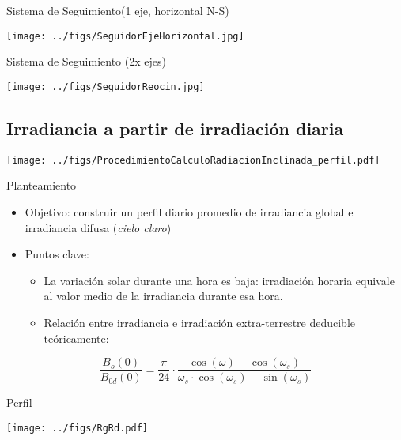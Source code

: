 \documentclass[xcolor={usenames,svgnames,dvipsnames}]{beamer}
\begin{document}
\begin{frame}[label={sec:orgeb36225}]{Sistema de Seguimiento(1 eje, horizontal N-S)}
\begin{center}
\texttt{[image: ../figs/SeguidorEjeHorizontal.jpg]}
\end{center}
\end{frame}

\begin{frame}[label={sec:org67055c9}]{Sistema de Seguimiento (2x ejes)}
\begin{center}
\texttt{[image: ../figs/SeguidorReocin.jpg]}
\end{center}
\end{frame}


\subsection{Irradiancia a partir de irradiación diaria}
\label{sec:org3b8f291}
\begin{frame}[label={sec:org46179c6}]{}
\begin{center}
\texttt{[image: ../figs/ProcedimientoCalculoRadiacionInclinada\_perfil.pdf]}
\end{center}
\end{frame}

\begin{frame}[label={sec:orgc460060}]{Planteamiento}
\begin{itemize}
\item \alert{Objetivo}: construir un perfil diario promedio de irradiancia global e irradiancia difusa (\emph{cielo claro})
\item \alert{Puntos clave}:
\begin{itemize}
\item La variación solar durante una hora es baja: irradiación horaria equivale al valor medio de la irradiancia durante esa hora.
\item Relación entre irradiancia e irradiación extra-terrestre deducible teóricamente:
\end{itemize}
\end{itemize}

\[
\frac{B_{o}(0)}{B_{0d}(0)}=\frac{\pi}{24}\cdot\frac{\cos(\omega)-\cos(\omega_{s})}{\omega_{s}\cdot\cos(\omega_{s})-\sin(\omega_{s})}
\]
\end{frame}

\begin{frame}[label={sec:org64b7e1e}]{Perfil}
\begin{center}
\texttt{[image: ../figs/RgRd.pdf]}
\end{center}
\end{frame}
\end{document}
